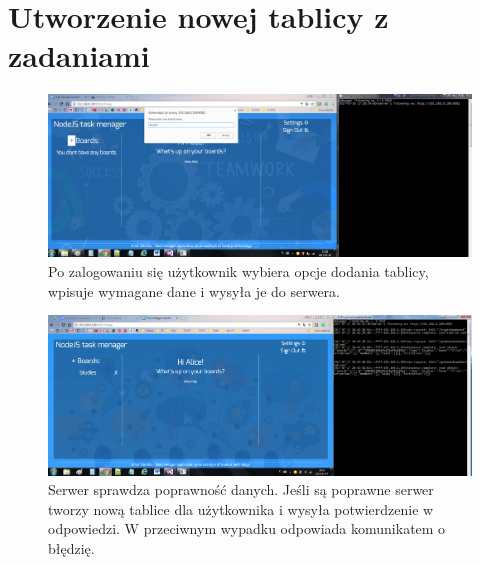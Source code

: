 \documentclass[12pt]{report}
\begin{document}
\section{Utworzenie nowej tablicy z zadaniami}
\begin{figure}[!hb]
\centering
\includegraphics[width=\textwidth,height=\textheight,keepaspectratio]{71.png}
\captionsetup{labelformat=empty}
\caption[]{Po zalogowaniu się użytkownik wybiera opcje dodania tablicy, wpisuje wymagane dane i wysyła je do serwera.}
\end{figure}
\begin{figure}[!hb]
\centering
\includegraphics[width=\textwidth,height=\textheight,keepaspectratio]{72.png}
\captionsetup{labelformat=empty}
\caption[]{Serwer sprawdza poprawność danych. 
Jeśli są poprawne serwer tworzy nową tablice dla użytkownika i wysyła potwierdzenie w odpowiedzi.
W przeciwnym wypadku odpowiada komunikatem o błędzię.}
\end{figure}
\end{document}
